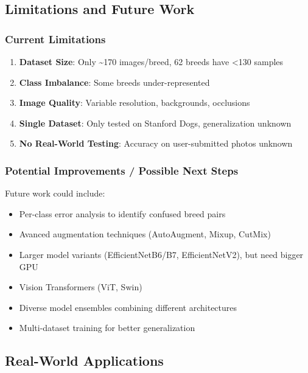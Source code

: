 \documentclass[
  letterpaper,
  DIV=11,
  numbers=noendperiod]{scrartcl}
\providecommand{\tightlist}{%
  \setlength{\itemsep}{0pt}\setlength{\parskip}{0pt}}
\begin{document}
\subsection{Limitations and Future
Work}\label{limitations-and-future-work}

\subsubsection{Current Limitations}\label{current-limitations}

\begin{enumerate}
\def\labelenumi{\arabic{enumi}.}
\tightlist
\item
  \textbf{Dataset Size}: Only \textasciitilde170 images/breed, 62 breeds
  have \textless130 samples
\item
  \textbf{Class Imbalance}: Some breeds under-represented
\item
  \textbf{Image Quality}: Variable resolution, backgrounds, occlusions
\item
  \textbf{Single Dataset}: Only tested on Stanford Dogs, generalization
  unknown
\item
  \textbf{No Real-World Testing}: Accuracy on user-submitted photos
  unknown
\end{enumerate}

\subsubsection{Potential Improvements / Possible Next
Steps}\label{potential-improvements-possible-next-steps}

Future work could include:

\begin{itemize}
\tightlist
\item
  Per-class error analysis to identify confused breed pairs
\item
  Avanced augmentation techniques (AutoAugment, Mixup, CutMix)
\item
  Larger model variants (EfficientNetB6/B7, EfficientNetV2), but need
  bigger GPU
\item
  Vision Transformers (ViT, Swin)
\item
  Diverse model ensembles combining different architectures
\item
  Multi-dataset training for better generalization
\end{itemize}

\subsection{Real-World Applications}\label{real-world-applications}
\end{document}
